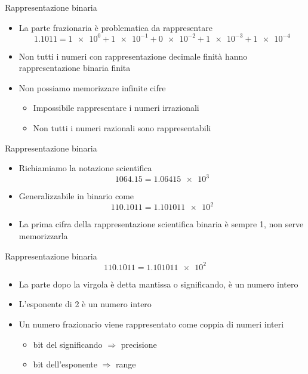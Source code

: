 \begin{frame}{Rappresentazione binaria}
  \vfill
  \begin{itemize}
    \item La parte frazionaria è problematica da rappresentare
    \[\num[group-digits = false]{1.1011} = \num[exponent-base = 2]{1e0} + \num[exponent-base = 2]{1e-1}
    + \num[exponent-base = 2]{0e-2} + \num[exponent-base = 2]{1e-3} + \num[exponent-base = 2]{1e-4}\]
    \item Non tutti i numeri con rappresentazione decimale finità hanno rappresentazione
    binaria finita
    \vfill
    \item Non possiamo memorizzare infinite cifre
    \begin{itemize}
      \item Impossibile rappresentare i numeri irrazionali
      \item Non tutti i numeri razionali sono rappresentabili
    \end{itemize}
  \end{itemize}
  \vfill
\end{frame}

\begin{frame}{Rappresentazione binaria}
  \vfill
  \begin{itemize}
    \item Richiamiamo la notazione scientifica
    \[\num{1064.15} = \num{1.06415e3}\]
    \item Generalizzabile in binario come
    \[\num[group-digits = false]{110.1011} = \num[exponent-base = 2,group-digits = false]{1.101011e2}\]
    \item La \alert{prima} cifra della rappresentazione scientifica binaria è \alert{sempre 1}, non serve memorizzarla
  \end{itemize}
  \vfill
\end{frame}

\begin{frame}{Rappresentazione binaria}
  \vfill
    \[\num[group-digits = false]{110.1011} = \num[exponent-base = 2,group-digits = false]{1.101011e2}\]
  \begin{itemize}
    \item La parte dopo la virgola è detta \alert{mantissa} o \alert{significando}, è un numero intero
    \vfill
    \item L'\alert{esponente} di 2 è un numero intero
    \vfill
    \item Un numero frazionario viene rappresentato come coppia di numeri interi
    \begin{itemize}
      \item bit del significando \(\Rightarrow\) precisione
      \item bit dell'esponente \(\Rightarrow\) range
    \end{itemize}
  \end{itemize}
  \vfill
\end{frame}

